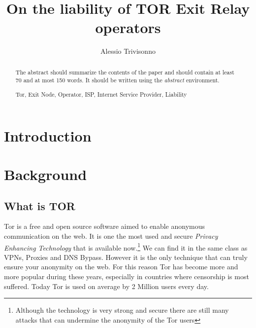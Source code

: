 \documentclass[runningheads,a4paper]{llncs}
\newcommand{\keywords}[1]{\par\addvspace\baselineskip
\noindent\keywordname\enspace\ignorespaces#1}
\begin{document}
\mainmatter  %

\title{On the liability of TOR Exit Relay operators}

\titlerunning{}

%
%
\author{Alessio Trivisonno}
%
\authorrunning{}


%
%

\toctitle{}
\tocauthor{}
\maketitle


\begin{abstract}
The abstract should summarize the contents of the paper and should
contain at least 70 and at most 150 words. It should be written using the
\emph{abstract} environment.
\keywords{Tor, Exit Node, Operator, ISP, Internet Service Provider, Liability}
\end{abstract}


\section{Introduction}

\section{Background}

\subsection{What is TOR}

Tor is a free and open source software aimed to enable anonymous communication on the web. It is one the most used and secure \textit{Privacy Enhancing Technology} that is available now.\footnote{Although the technology is very strong and secure there are still many attacks that can undermine the anonymity of the Tor users} We can find it in the same class as VPNs, Proxies and DNS Bypass. However it is the only technique that can truly ensure your anonymity on the web. For this reason Tor has become more and more popular during these years, especially in countries where censorship is most suffered. Today Tor is used on average by 2 Million users every day.
\end{document}
